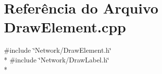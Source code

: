 \section{Referência do Arquivo Draw\+Element.\+cpp}
\label{_draw_element_8cpp}
{\ttfamily \#include \char`\"{}Network/\+Draw\+Element.\+h\char`\"{}}\\*
{\ttfamily \#include \char`\"{}Network/\+Draw\+Label.\+h\char`\"{}}\\*
